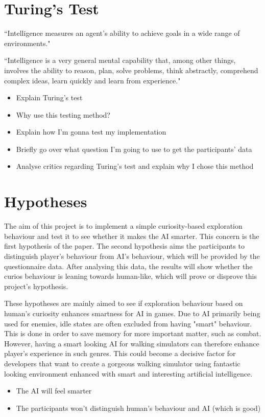\documentclass[journal]{IEEEtran}
\begin{document}
\section{Turing's Test}
``Intelligence measures an agent’s ability to achieve goals in a wide range of
environments." \cite{legg2007universal}

``Intelligence is a very general mental capability that, among other things, involves
the ability to reason, plan, solve problems, think abstractly, comprehend complex
ideas, learn quickly and learn from experience." \cite{gottfredson1997mainstream}
\begin{itemize}
	\item Explain Turing's test
	\item Why use this testing method?
	\item Explain how I'm gonna test my implementation
	\item Briefly go over what question I'm going to use to get the participants' data
	\item Analyse critics regarding Turing's test and explain why I chose this method
\end{itemize}

\section{Hypotheses}
The aim of this project is to implement a simple curiosity-based exploration behaviour and test it to see whether it makes the AI smarter. This concern is the first hypothesis of the paper. The second hypothesis aims the participants to distinguish player's behaviour from AI's behaviour, which will be provided by the questionnaire data. After analysing this data, the results will show whether the curios behaviour is leaning towards human-like, which will prove or disprove this project's hypothesis.

These hypotheses are mainly aimed to see if exploration behaviour based on human's curiosity enhances smartness for AI in games. Due to AI primarily being used for enemies, idle states are often excluded from having "smart" behaviour. This is done in order to save memory for more important matter, such as combat. However, having a smart looking AI for walking simulators can therefore enhance player's experience in such genres. This could become a decisive factor for developers that want to create a gorgeous walking simulator using fantastic looking environment enhanced with smart and interesting artificial intelligence.
\begin{itemize}
	\item The AI will feel smarter
	\item The participants won't distinguish human's behaviour and AI (which is good)
\end{itemize}
\end{document}
